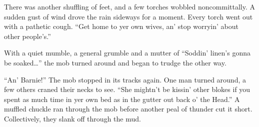There was another shuffling of feet, and a few torches wobbled noncommittally.
A sudden gust of wind drove the rain sideways for a moment.
Every torch went out with a pathetic cough.
``Get home to yer own wives, an' stop worryin' about other people's.''

With a quiet mumble, a general grumble and a mutter of ``Soddin' linen's gonna be soaked{\dots}'' the mob turned around and began to trudge the other way.

``An' Barnie!''
The mob stopped in its tracks again.
One man turned around, a few others craned their necks to see.
``She mightn't be kissin' other blokes if you spent as much time in yer own bed as in the gutter out back o' the Head.''
A muffled chuckle ran through the mob before another peal of thunder cut it short.
Collectively, they slank off through the mud.
